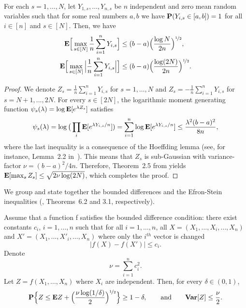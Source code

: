 \begin{theorem}\label{Hoeffding1}
	For each $s=1,\ldots,N$, let $Y_{1,s},\ldots,Y_{n,s}$ be $n$ independent and zero mean random variables such that
	for some real numbers $a,b$ we have $\mathbf P(Y_{i,s}\in[a,b])=1$ for all $i\in[n]$
	and $s\in[N]$. Then, we have
	\begin{align}
	\mathbf E\Big[\max_{s\in[N]} \frac1n\sum_{i=1}^n Y_{i,s}\Big]&\le (b-a)\Big(\frac{\log N}{2n}\Big)^{\nicefrac12},\\
	\mathbf E\Big[\max_{s\in[N]}\Big| \frac1n\sum_{i=1}^n Y_{i,s}\Big|\Big]&\le (b-a)\Big(\frac{\log(2N)}{2n}\Big)^{\nicefrac12}.
	\end{align}
\end{theorem}
\begin{proof}
	We denote $Z_s = \frac1n\sum_{i=1}^n Y_{i,s}$ for $s=1,\ldots, N$ and $Z_s = -\frac1n\sum_{i=1}^n Y_{i,s}$
	for $s=N+1,\ldots,2N$. For every $s\in[2N]$, the logarithmic moment generating function $\psi_s(\lambda) =
	\log \mathbf E[e^{\lambda Z_{s}}]$ satisfies
	\begin{equation}
	\psi_s(\lambda) =  \log \big(\prod_i \mathbf E[e^{\lambda Y_{i,s}/n}])
	= \sum_{i=1}^n \log  \mathbf E[e^{\lambda Y_{i,s}/n}] \le \frac{\lambda^2(b-a)^2}{8n},
	\end{equation}
	where the last inequality is a consequence of the Hoeffding lemma (see, for instance,  Lemma~2.2
	in~\citep{boucheron2013concentration}). This means that $Z_s$ is sub-Gaussian with variance-factor
	$\nu = {(b-a)^2}/{4n}$. Therefore, Theorem~2.5 from \citep{boucheron2013concentration}
	yields $\mathbf E[\max_s Z_s]\le \sqrt{2\nu\log(2N)}$, which completes the proof.
\end{proof}

We group and state together the bounded differences and the Efron-Stein inequalities (\cite{boucheron2013concentration},
Theorems~6.2 and 3.1, respectively).

\begin{theorem}\label{McDiarmid}
	Assume that a function f satisfies the bounded difference condition: there exist constants $c_i$, $i=1,\ldots,n$
	such that for all $i=1,\ldots, n$, all $X=(X_1,\dots,X_i,\dots,X_n)$ and $X'=(X_1,\dots,X'_i,\dots,X_n)$ where
	only the $i^{th}$ vector is changed
	\begin{equation}
	|f(X)-f(X')| \leq c_i.
	\end{equation}
	Denote
	\begin{equation}
	\nu = \sum_{i=1}^n c_i^2.
	\end{equation}
	Let $Z=f(X_1,\dots,X_n)$ where $X_i$ are independent. Then, for every $\delta\in(0,1)$,
	\begin{equation}
	\mathbf P\Big\{Z\le \mathbf E Z +\Big(\frac{\nu\log(1/\delta)}{2}\Big)^{\nicefrac12} \Big\} \geq 1-\delta,\qquad\text{and}\qquad {\bf Var}[Z] \le \frac{\nu}{2}.
	\end{equation}
\end{theorem}

